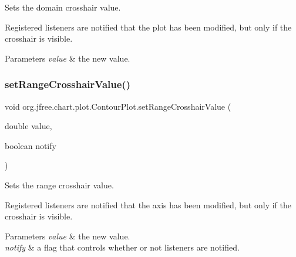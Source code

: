 Sets the domain crosshair value. 

Registered listeners are notified that the plot has been modified, but only if the crosshair is visible.


\begin{DoxyParams}{Parameters}
{\em value} & the new value. \\
\hline
\end{DoxyParams}
\mbox{\label{classorg_1_1jfree_1_1chart_1_1plot_1_1_contour_plot_ab8d5bed363c87aec830fdaf842c1b8ab}} 
\subsubsection{\texorpdfstring{set\+Range\+Crosshair\+Value()}{setRangeCrosshairValue()}\hspace{0.1cm}{\footnotesize\ttfamily [2/2]}}
{\footnotesize\ttfamily void org.\+jfree.\+chart.\+plot.\+Contour\+Plot.\+set\+Range\+Crosshair\+Value (\begin{DoxyParamCaption}\item[{double}]{value,  }\item[{boolean}]{notify }\end{DoxyParamCaption})}

Sets the range crosshair value. 

Registered listeners are notified that the axis has been modified, but only if the crosshair is visible.


\begin{DoxyParams}{Parameters}
{\em value} & the new value. \\
\hline
{\em notify} & a flag that controls whether or not listeners are notified. \\
\hline
\end{DoxyParams}
\mbox{\label{classorg_1_1jfree_1_1chart_1_1plot_1_1_contour_plot_a50a42c7831f868fb2cc9ec0f9059d245}} 
